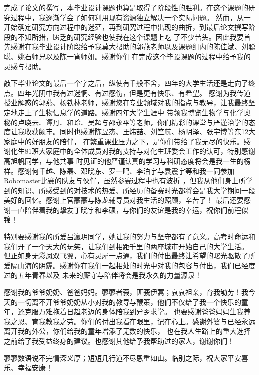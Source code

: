 

完成了论文的撰写，本毕业设计课题也算是取得了阶段性的胜利。在这个课题的研究过程中，我逐渐学会了如何利用现有资源独立解决一个实际问题。
然而，从一开始确定研究方向过程中的迷茫，再到研究过程中出现的曲折，到最后论文撰写阶段的不知所措，匮乏的研究经验也使我在这个课题上吃
了不少苦头。因此我要首先感谢在我毕业设计阶段给予我莫大帮助的郭燕老师以及课题组内的陈佳斌、刘聪聪、姚石师兄以及陈一宵师姐。感谢你们
在完成这个毕设课题的过程中给予我的灵感与帮助。

敲下毕业论文的最后一个字之后，纵使有千般不舍，四年的大学生活还是走向了终点。四年光阴中我有过迷惘、有过感伤，但是更有快乐、有希望。
感谢为我传道授业解惑的郭燕、杨铁林老师，感谢您在专业领域对我的指点与教导，让我最终坚定地走上了生物信息学的道路。感谢四年大学生涯中
带领我博览生物学与化学奥秘的卢晓云、谭丹、和玲、吴超与邵永平等老师，你们精彩的课堂与严谨治学的态度让我收获颇丰。同时也感谢陈昱杰、王炜喆、刘竺航、杨明泽、张宇博等东12大家庭中的好朋友的陪伴，
在繁重课业压力之下，是你们带给了我无尽的快乐。感谢化生81班大家庭中的全体成员对我的支持与对化生班委会工作的认可，特别感谢高旭帆同学，与他共事
时见证的他严谨认真的学习与科研态度将会是我一生的榜样。感谢何千越、陈磊、邓晓东、罗一鸣、李泊宇与袁震宇等和我一同参加Robomaster比赛的队友与伙伴，虽然参赛过程中也有波折
，但我从他们身上所学到的知识、所感受到的对技术的热爱、所经历的备赛时光都将会是我大学期间一段美好的回忆。感谢上官蒙蒙与陈龙辅导员对我生活的照顾，辛苦了！
最后还要感谢一直陪伴着我的挚友丁晓宇和李硕，与你们的友谊是我的幸运，祝你们前程似锦！

特别要感谢我的所爱吕瀛玥同学，她让我的努力与坚守都有了意义。高考时命运和我们开了一个天大的玩笑，让我们到相距千里的两座城市开始自己的大学生活。
但正如身无彩凤双飞翼，心有灵犀一点通，我们的付出最终让希望的曙光驱散了所爱隔山海的阴霾。感谢你在我们一起相处的时光中对我的包容与付出，我们已经度过的五年青春以及
未来的厮守与陪伴将会是我永久的力量源泉！

感谢我的爷爷奶奶、爸爸妈妈。蓼蓼者莪，匪莪伊蒿；哀哀祖亲，育我劬劳！我今天的一切离不开爷爷奶奶从小对我的教导与鞭策，他们不仅给了我一个快乐的童年，还克服万难拖着日趋老迈的身体陪我到异乡求学。
也要感谢爸爸妈妈生我养我之恩、育我教我之劳。你们的付出我看在眼里，记在心上。感谢外婆与已经永远离开我的外公，你们给我的童年增添了无数的快乐，
也在我人生路上的重大选择之前给了我受益终身的建议。也感谢其他给予我帮助过的家人，谢谢你们！

寥寥数语说不完情深义厚；短短几行道不尽恩重如山。临别之际，祝大家平安喜乐、幸福安康！
